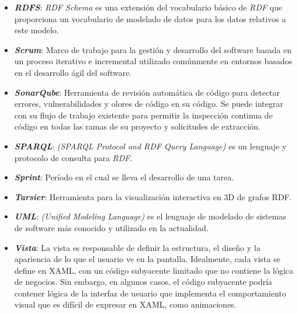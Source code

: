 \begin{itemize}
    \item \textbf{\textit{RDFS}}: \emph{RDF Schema} es una 
    extensión del vocabulario básico de \emph{RDF} que proporciona un 
    vocabulario de modelado de datos para los datos relativos a este modelo.

    \item \textbf{\textit{Scrum}}: Marco de trabajo para la gestión y 
    desarrollo del software basada en un proceso iterativo e incremental 
    utilizado comúnmente en entornos basados en el desarrollo ágil del
    software.
    
    \item \textbf{\textit{SonarQube}}: Herramienta de revisión automática 
    de código para detectar errores, vulnerabilidades y olores de código 
    en su código. Se puede integrar con su flujo de trabajo existente 
    para permitir la inspección continua de código en todas las ramas 
    de su proyecto y solicitudes de extracción.

    \item \textbf{\textit{SPARQL}}: \emph{(SPARQL Protocol and RDF Query 
    Language)} es un lenguaje y protocolo de consulta para \emph{RDF}. 

    \item \textbf{\textit{Sprint}}: Período en el cual se lleva el 
    desarrollo de una tarea.

    \item \textbf{\textit{Tarsier}}: Herramienta para la visualización 
    interactiva en 3D de grafos RDF.\@

    \item \textbf{\textit{UML}}: \emph{(Unified Modeling Language)} es el 
    lenguaje de modelado de sistemas de software más conocido y utilizado 
    en la actualidad.

    \item \textbf{\textit{Vista}}: La vista es responsable de definir 
    la estructura, el diseño y la apariencia de lo que el usuario ve 
    en la pantalla. Idealmente, cada vista se define en XAML, con un 
    código subyacente limitado que no contiene la lógica de negocios. 
    Sin embargo, en algunos casos, el código subyacente podría contener 
    lógica de la interfaz de usuario que implementa el comportamiento 
    visual que es difícil de expresar en XAML, como animaciones.


\end{itemize}
